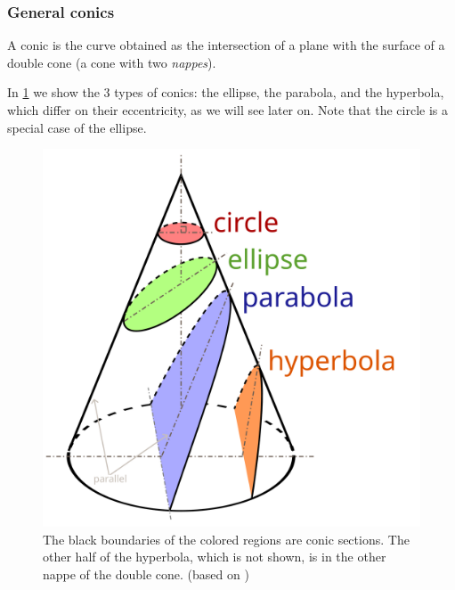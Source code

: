 \documentclass[../main.tex]{subfiles}
\begin{document}
\subsubsection{General conics}
\begin{definition}
  A conic is the curve obtained as the intersection of a plane with the surface of a double cone (a cone with two \emph{nappes}).
\end{definition}
In \cref{fig:conics} we show the 3 types of conics: the ellipse, the parabola, and the hyperbola, which differ on their eccentricity, as we will see later on. Note that the circle is a special case of the ellipse.
\begin{figure}[htbp]
  \centering
  \begin{minipage}[t]{0.45\textwidth}
    \centering
    \includegraphics[width=\textwidth]{Images/Conic_Sections.pdf}
    \caption{The black boundaries of the colored regions are conic sections. The other half of the hyperbola, which is not shown, is in the other nappe of the double cone. (based on \cite{wiki:conic})}
    \label{fig:conics}
  \end{minipage}
  \hfill
  \begin{minipage}[t]{0.45\textwidth}
    \centering

\end{minipage}
\end{figure}
\end{document}
